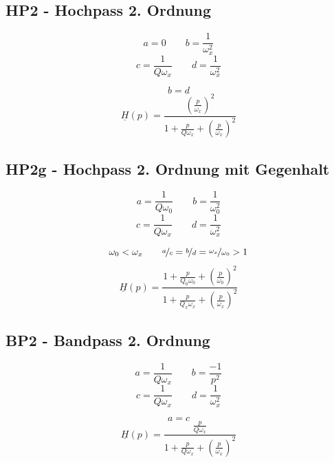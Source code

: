 \documentclass[a4paper, 12pt]{report}
\begin{document}
	\subsection*{HP2 - Hochpass 2. Ordnung}
		\begin{minipage}[t]{0.5\textwidth}
			\[ a = 0 \qquad b = \frac{1}{\omega^2_x} \]
			\[ c = \frac{1}{Q\omega_x} \qquad d = \frac{1}{\omega^2_x} \]
		\end{minipage}
		\begin{minipage}[t]{0.5\textwidth}
			\[ b = d \]
			\vspace{-0.2cm}
			\[ \underline{H}(p) = \frac{\left(\frac{p}{\omega_x}\right)^2}{1 + \frac{p}{Q\omega_x} + \left(\frac{p}{\omega_x}\right)^2} \]
		\end{minipage}
	
	\subsection*{HP2g - Hochpass 2. Ordnung mit Gegenhalt}
		\begin{minipage}[t]{0.5\textwidth}
			\[ a = \frac{1}{Q\omega_0} \qquad b = \frac{1}{\omega^2_0} \]
			\[ c = \frac{1}{Q\omega_x} \qquad d = \frac{1}{\omega^2_x} \]
		\end{minipage}
		\begin{minipage}[t]{0.5\textwidth}
			\[ \omega_0 < \omega_x \qquad \nicefrac{a}{c} = \nicefrac{b}{d} = \nicefrac{\omega_x}{\omega_0} > 1 \]
			\vspace{-0.2cm}
			\[ \underline{H}(p) = \frac{1 + \frac{p}{Q_0\omega_0} + \left(\frac{p}{\omega_0}\right)^2}{1 + \frac{p}{Q_x\omega_x} + \left(\frac{p}{\omega_x}\right)^2} \]
		\end{minipage}
	
	\subsection*{BP2 - Bandpass 2. Ordnung}
		\begin{minipage}[t]{0.5\textwidth}
			\[ a = \frac{1}{Q\omega_x} \qquad b = \frac{-1}{p^2} \]
			\[ c = \frac{1}{Q\omega_x} \qquad d = \frac{1}{\omega^2_x} \]
		\end{minipage}
		\begin{minipage}[t]{0.5\textwidth}
			\[ a = c \]
			\vspace{-0.2cm}
			\[ \underline{H}(p) = \frac{\frac{p}{Q\omega_x}}{1 + \frac{p}{Q\omega_x} + \left(\frac{p}{\omega_x}\right)^2} \]
		\end{minipage}
		
\end{document}
